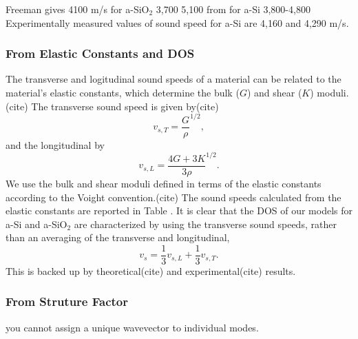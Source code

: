 \documentclass[aps,prb,twocolumn,superscriptaddress,footinbib,amsmath,amssymb,floatfix]{revtex4}
\begin{document}
Freeman gives 4100 m/s for a-SiO$_2$\cite{freeman_thermal_1986}
3,700 5,100 from \cite{pohl_low-temperature_2002}
for a-Si 3,800-4,800\cite{pohl_low-temperature_2002}
Experimentally measured values of sound speed for a-Si are 4,160
\cite{senn_physics_1979} and 
4,290 m/s\cite{vacher_attenuation_1980}.
\cite{feldman_elastic_1991} 

\subsubsection{\label{S:Structure}From Elastic Constants and DOS}

The transverse and logitudinal sound speeds of a material can be related 
to the material's elastic constants, which determine the bulk ($G$) and 
shear ($K$) moduli.(cite) The transverse sound speed is given by(cite)  
\begin{equation}\label{EQ:Dynamical}
v_{s,T} = \frac{G}{\rho}^{1/2},
\end{equation}
and the longitudinal by
\begin{equation}\label{EQ:Dynamical}
v_{s,L} = \frac{4G + 3K}{3\rho}^{1/2}.
\end{equation}
We use the bulk and shear moduli defined in terms of the elastic 
constants according to the Voight convention.(cite) 
The sound speeds calculated from the 
elastic constants are reported in Table . It is clear that the DOS of 
our models for a-Si and a-SiO$_2$ are characterized by using the 
transverse sound speeds, rather than an averaging of the transverse 
and longitudinal, 
\begin{equation}\label{EQ:Dynamical}
v_{s} = \frac{1}{3}v_{s,L} + \frac{1}{3}v_{s,T}. 
\end{equation}
This is backed up by theoretical(cite) and experimental(cite) results. 

\subsubsection{\label{S:Structure}From Struture Factor}

you cannot assign a unique wavevector to individual modes.
\cite{biswas_vibrational_1988}
\end{document}
